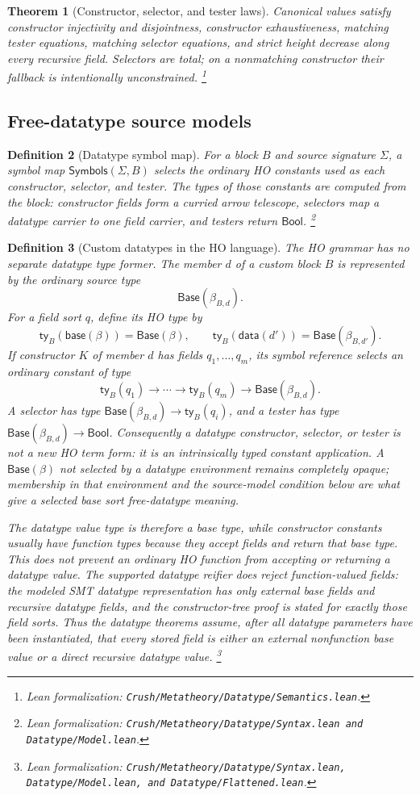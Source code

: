 \documentclass[11pt]{article}
\newtheorem{definition}{Definition}[section]
\newtheorem{theorem}[definition]{Theorem}
\theoremstyle{remark}
\newcommand{\leanfile}[1]{\footnote{Lean formalization: \texttt{Crush/Metatheory/#1}.}}
\newcommand{\leanfiles}[1]{\footnote{Lean formalization: \texttt{Crush/Metatheory/#1}.}}
\newcommand{\Bool}{\mathsf{Bool}}
\newcommand{\Base}{\mathsf{Base}}
\newcommand{\dsort}[2]{\beta_{#1,#2}}
\begin{document}
\begin{theorem}[Constructor, selector, and tester laws]
Canonical values satisfy constructor injectivity and disjointness,
constructor exhaustiveness, matching tester equations, matching selector
equations, and strict height decrease along every recursive field. Selectors
are total; on a nonmatching constructor their fallback is intentionally
unconstrained.
\leanfile{Datatype/Semantics.lean}
\end{theorem}

\subsection{Free-datatype source models}

\begin{definition}[Datatype symbol map]
For a block $B$ and source signature $\Sigma$, a symbol map
$\mathsf{Symbols}(\Sigma,B)$ selects the ordinary HO constants used as each
constructor, selector, and tester. The types of those constants are computed
from the block: constructor fields form a curried arrow telescope, selectors
map a datatype carrier to one field carrier, and testers return $\Bool$.
\leanfiles{Datatype/Syntax.lean and Datatype/Model.lean}
\end{definition}

\begin{definition}[Custom datatypes in the HO language]
The HO grammar has no separate datatype type former. The member $d$ of a
custom block $B$ is represented by the ordinary source type
\[
  \Base(\dsort{B}{d}).
\]
For a field sort $q$, define its HO type by
\[
 \mathsf{ty}_B(\mathsf{base}(\beta))=\Base(\beta),
 \qquad
 \mathsf{ty}_B(\mathsf{data}(d'))=\Base(\dsort{B}{d'}).
\]
If constructor $K$ of member $d$ has fields
$q_1,\ldots,q_m$, its symbol reference selects an ordinary constant of type
\[
 \mathsf{ty}_B(q_1)\to\cdots\to\mathsf{ty}_B(q_m)
   \to\Base(\dsort{B}{d}).
\]
A selector has type
$\Base(\dsort{B}{d})\to\mathsf{ty}_B(q_i)$, and a tester has type
$\Base(\dsort{B}{d})\to\Bool$. Consequently a datatype constructor,
selector, or tester is not a new HO term form: it is an intrinsically typed
constant application. A $\Base(\beta)$ not selected by a datatype environment
remains completely opaque; membership in that environment and the source-model
condition below are what give a selected base sort free-datatype meaning.

The datatype value type is therefore a base type, while constructor constants
usually have function types because they accept fields and return that base
type. This does not prevent an ordinary HO function from accepting or returning
a datatype value. The supported datatype reifier does reject function-valued
\emph{fields}: the modeled SMT datatype representation has only external base
fields and recursive datatype fields, and the constructor-tree proof is stated
for exactly those field sorts. Thus the datatype theorems assume, after all
datatype parameters have been instantiated, that every stored field is either
an external nonfunction base value or a direct recursive datatype value.
\leanfiles{Datatype/Syntax.lean, Datatype/Model.lean, and Datatype/Flattened.lean}
\end{definition}
\end{document}
